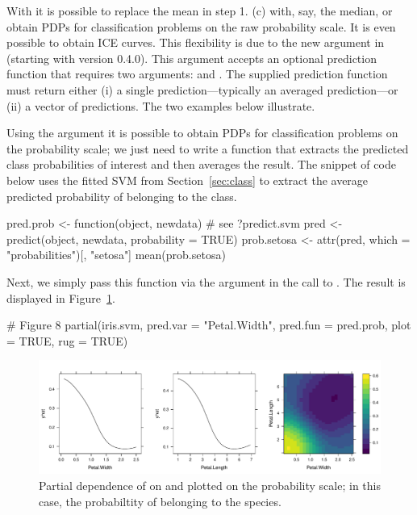 With  it is possible to replace the mean in step 1. (c) with, say, the median, or obtain PDPs for classification problems on the raw probability scale. It is even possible to obtain ICE curves. This flexibility is due to the new  argument in  (starting with  version 0.4.0). This argument accepts an optional prediction function that requires two arguments:  and . The supplied prediction function must return either (i) a single prediction---typically an averaged prediction---or  (ii) a vector of predictions. The two examples below illustrate.

Using the  argument it is possible to obtain PDPs for classification problems on the probability scale; we just need to write a function that extracts the predicted class probabilities of interest and then averages the result. The snippet of code below uses the fitted SVM from Section~\ref{sec:class} to extract the average predicted probability of belonging to the  class.
\begin{example}
pred.prob <- function(object, newdata) {  # see ?predict.svm
  pred <- predict(object, newdata, probability = TRUE)
  prob.setosa <- attr(pred, which = "probabilities")[, "setosa"]
  mean(prob.setosa)
}
\end{example}
Next, we simply pass this function via the  argument in the call to . The result is displayed in Figure~\ref{fig:partial_iris_prob}.
\begin{example}
# Figure 8
partial(iris.svm, pred.var = "Petal.Width", pred.fun = pred.prob, plot = TRUE,
        rug = TRUE)
\end{example}

\begin{figure}[!htbp]
  \centering
  \includegraphics[width=1.0\linewidth]{partial_iris_svm_prob}
  \caption{Partial dependence of  on  and  plotted on the probability scale; in this case, the probabiltity of belonging to the  species.}
  \label{fig:partial_iris_prob}
\end{figure}

